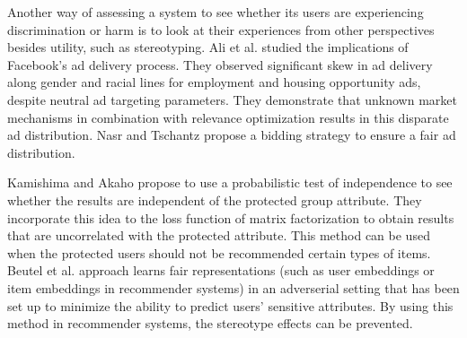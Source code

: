                 Another way of assessing a system to see whether its users are experiencing discrimination or harm is to look at their experiences from other perspectives besides utility, such as stereotyping. Ali et al.\cite{Ali2019Facebook} studied the implications of Facebook's ad delivery process. They observed significant skew in ad delivery along gender and racial lines for employment and housing opportunity ads, despite neutral ad targeting parameters. They demonstrate that unknown market mechanisms in combination with relevance optimization results in this disparate ad distribution. Nasr and Tschantz \cite{nasr2020bidding} propose a bidding strategy to ensure a fair ad distribution. 
                
                Kamishima and Akaho \cite{kamishima2017considerations, kamishima2018recommendation} propose to use a probabilistic test of independence to see whether the results are independent of the protected group attribute. They incorporate this idea to the loss function of matrix factorization to obtain results that are uncorrelated with the protected attribute. This method can be used when the protected users should not be recommended certain types of items. Beutel et al.\cite{beutel2017data} approach learns fair representations (such as user embeddings or item embeddings in recommender systems) in an adverserial setting that has been set up to minimize the ability to predict users' sensitive attributes. By using this method in recommender systems, the stereotype effects can be prevented.
            
